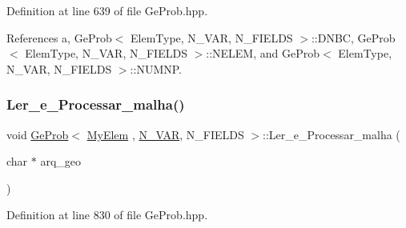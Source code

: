 Definition at line 639 of file Ge\+Prob.\+hpp.



References a, Ge\+Prob$<$ Elem\+Type, N\+\_\+\+V\+A\+R, N\+\_\+\+F\+I\+E\+L\+D\+S $>$\+::\+D\+N\+BC, Ge\+Prob$<$ Elem\+Type, N\+\_\+\+V\+A\+R, N\+\_\+\+F\+I\+E\+L\+D\+S $>$\+::\+N\+E\+L\+EM, and Ge\+Prob$<$ Elem\+Type, N\+\_\+\+V\+A\+R, N\+\_\+\+F\+I\+E\+L\+D\+S $>$\+::\+N\+U\+M\+NP.

\mbox{\label{classGeProb_ac1030cadfbc0d88e817617a927dbc31f}} 
\subsubsection{\texorpdfstring{Ler\+\_\+e\+\_\+\+Processar\+\_\+malha()}{Ler\_e\_Processar\_malha()}}
{\footnotesize\ttfamily void \hyperlink{classGeProb}{Ge\+Prob}$<$ \hyperlink{DG__Prob_8h_a83cd887ced9a6587428f267e50cd4787}{My\+Elem} , \hyperlink{classED__Prob_a4e7d2ff1a8e435e336fb00c527224b5a}{N\+\_\+\+V\+AR}, N\+\_\+\+F\+I\+E\+L\+DS $>$\+::Ler\+\_\+e\+\_\+\+Processar\+\_\+malha (\begin{DoxyParamCaption}\item[{char $\ast$}]{arq\+\_\+geo }\end{DoxyParamCaption})\hspace{0.3cm}{\ttfamily [inherited]}}



Definition at line 830 of file Ge\+Prob.\+hpp.



